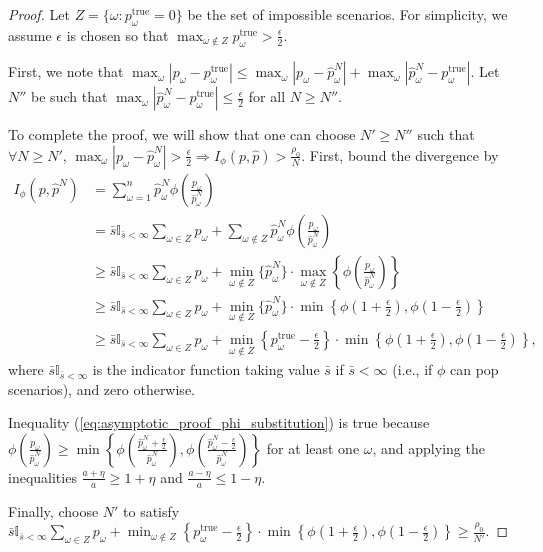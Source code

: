 \documentclass[ijoc,letterpaper]{informs3} %
\newcommand{\ptrue}{p^{\text{true}}}
\begin{document}
\begin{proof}
	Let $Z = \{\omega : \ptrue_\omega = 0\}$ be the set of impossible scenarios.
	For simplicity, we assume $\epsilon$ is chosen so that $\max_{\omega \notin Z} \ptrue_\omega > \frac{\epsilon}{2}$.
	
	First, we note that $\max_\omega |p_\omega - \ptrue_\omega| \leq \max_\omega |p_\omega - \hat{p}^N_\omega| + \max_\omega |\hat{p}^N_\omega - \ptrue_\omega|$.
	Let $N''$ be such that $\max_\omega |\hat{p}^N_\omega - \ptrue_\omega| \leq \frac{\epsilon}{2}$ for all $N \geq N''$.
	
	To complete the proof, we will show that one can choose $N' \geq N''$ such that $\forall N \geq N'$, $\max_\omega |p_\omega - \hat{p}^N_\omega| > \frac{\epsilon}{2} \Rightarrow I_\phi(p,\hat{p}) > \frac{\rho_0}{N}$.
	First, bound the divergence by
	\begin{align}
		I_{\phi}(p,\hat{p}^N) & = \sum_{\omega=1}^n \hat{p}^N_\omega \phi\left( \frac{p_\omega}{\hat{p}^N_\omega} \right) \nonumber \\
		& = \bar{s} \mathbb{I}_{\bar{s} < \infty} \sum_{\omega \in Z} p_\omega + \sum_{\omega \notin Z} \hat{p}^N_\omega \phi\left( \frac{p_\omega}{\hat{p}^N_\omega} \right) \nonumber \\
		& \geq \bar{s} \mathbb{I}_{\bar{s} < \infty} \sum_{\omega \in Z} p_\omega + \min_{\omega \notin Z} \{\hat{p}^N_\omega\} \cdot \max_{\omega \notin Z} \left\{ \phi \left( \frac{p_\omega}{\hat{p}^N_\omega} \right) \right\} \nonumber \\
		& \geq \bar{s} \mathbb{I}_{\bar{s} < \infty} \sum_{\omega \in Z} p_\omega  + \min_{\omega \notin Z} \{\hat{p}^N_\omega\} \cdot \min\left\{ \phi\left(1+\frac{\epsilon}{2}\right), \phi\left(1-\frac{\epsilon}{2}\right) \right\} \label{eq:asymptotic_proof_phi_substitution} \\
		& \geq \bar{s} \mathbb{I}_{\bar{s} < \infty} \sum_{\omega \in Z} p_\omega + \min_{\omega \notin Z} \left\{ \ptrue_\omega - \frac{\epsilon}{2} \right\} \cdot \min\left\{ \phi\left(1+\frac{\epsilon}{2}\right), \phi\left(1-\frac{\epsilon}{2}\right) \right\} \nonumber,
	\end{align}
	where $\bar{s}\mathbb{I}_{\bar{s} < \infty}$ is the indicator function taking value $\bar{s}$ if $\bar{s} < \infty$ (i.e., if $\phi$ can pop scenarios), and zero otherwise.
	
	Inequality (\ref{eq:asymptotic_proof_phi_substitution}) is true because $\phi \left( \frac{p_\omega}{\hat{p}^N_\omega} \right) \geq \min\left\{ \phi\left( \frac{\hat{p}^N_\omega+\tfrac{\epsilon}{2}}{\hat{p}^N_\omega} \right), \phi\left( \frac{\hat{p}^N_\omega-\tfrac{\epsilon}{2}}{\hat{p}^N_\omega} \right) \right\}$ for at least one $\omega$, and applying the inequalities $\frac{a+\eta}{a} \geq 1 + \eta$ and $\frac{a-\eta}{a} \leq 1-\eta$.
	
	Finally, choose $N'$ to satisfy $\bar{s} \mathbb{I}_{\bar{s} < \infty} \sum_{\omega \in Z} p_\omega + \min_{\omega \notin Z} \left\{ \ptrue_\omega - \frac{\epsilon}{2} \right\} \cdot \min\left\{ \phi\left(1+\frac{\epsilon}{2}\right), \phi\left(1-\frac{\epsilon}{2}\right) \right\} \geq \frac{\rho_0}{N'}$.
\end{proof}
\end{document}
